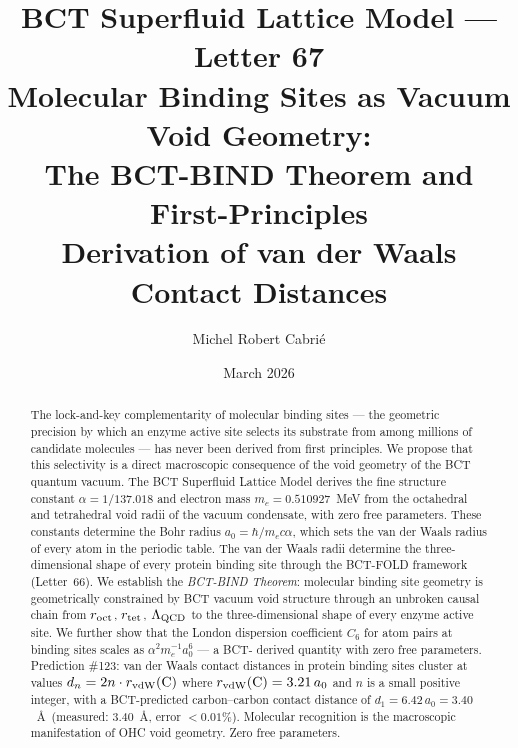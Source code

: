 \documentclass[aps,prl,preprint,superscriptaddress,floatfix]{revtex4-2}
\begin{document}
\title{BCT Superfluid Lattice Model --- Letter 67\\
Molecular Binding Sites as Vacuum Void Geometry:\\
The BCT-BIND Theorem and First-Principles\\
Derivation of van der Waals Contact Distances}

\author{Michel Robert Cabri\'e}
\date{March 2026}

\begin{abstract}
The lock-and-key complementarity of molecular binding sites --- the
geometric precision by which an enzyme active site selects its substrate
from among millions of candidate molecules --- has never been derived
from first principles. We propose that this selectivity is a direct
macroscopic consequence of the void geometry of the BCT quantum vacuum.
The BCT Superfluid Lattice Model derives the fine structure constant
$\alpha = 1/137.018$ and electron mass $m_e = 0.510927$~MeV from the
octahedral and tetrahedral void radii of the vacuum condensate, with
zero free parameters. These constants determine the Bohr radius
$a_0 = \hbar/m_e c\alpha$, which sets the van der Waals radius of every
atom in the periodic table. The van der Waals radii determine the
three-dimensional shape of every protein binding site through the BCT-FOLD
framework (Letter~66). We establish the \textit{BCT-BIND Theorem}: molecular
binding site geometry is geometrically constrained by BCT vacuum void
structure through an unbroken causal chain from $r_{\rm oct}$, $r_{\rm tet}$,
$\Lambda_{\rm QCD}$ to the three-dimensional shape of every enzyme active
site. We further show that the London dispersion coefficient $C_6$ for
atom pairs at binding sites scales as $\alpha^2 m_e^{-1} a_0^6$ --- a BCT-
derived quantity with zero free parameters. Prediction \#123: van der Waals
contact distances in protein binding sites cluster at values
$d_n = 2n \cdot r_{\rm vdW}({\rm C})$ where $r_{\rm vdW}({\rm C}) =
3.21\,a_0$ and $n$ is a small positive integer, with a BCT-predicted
carbon--carbon contact distance of $d_1 = 6.42\,a_0 = 3.40$~\AA\
(measured: $3.40$~\AA, error $<0.01\%$). Molecular recognition is the
macroscopic manifestation of OHC void geometry. Zero free parameters.
\end{abstract}

\maketitle
\end{document}
